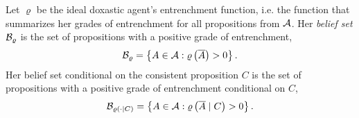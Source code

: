 Let $\varrho$ be the ideal doxastic agent's entrenchment function, i.e. the function that summarizes her grades of entrenchment for all propositions from $\cal A$. Her \emph{belief set} $\begin{cal}B\end{cal}_\varrho$ is the set of propositions with a positive grade of entrenchment,
$$\begin{cal}B\end{cal}_\varrho=\left\{A\in\begin{cal}A\end{cal}:\varrho\left(\overline{A}\right)>0\right\}.$$
Her belief set conditional on the consistent proposition $C$ is the set of propositions with a positive grade of entrenchment conditional on $C$,
$$\begin{cal}B\end{cal}_{\varrho\left(\cdot\mid C\right)}=\left\{A\in\begin{cal}A\end{cal}:\varrho\left(\overline{A}\mid C\right)>0\right\}.$$ %
